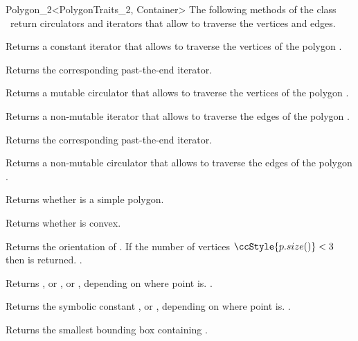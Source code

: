 \begin{ccRefClass}{Polygon_2<PolygonTraits_2, Container>}
\ccAccessFunctions
The following methods of the class \ccClassName\ return
circulators and iterators that allow to traverse the vertices and edges.

    { Returns a constant iterator that allows to traverse the vertices of
      the polygon .}

    { Returns the corresponding past-the-end iterator. }

    { Returns a mutable circulator that allows to traverse the vertices of
      the polygon .}

    { Returns a non-mutable iterator that allows to traverse the edges of
      the polygon .}

    { Returns the corresponding past-the-end iterator. }

    { Returns a non-mutable circulator that allows to traverse the edges of
      the polygon .}

\ccPredicates

    { Returns whether  is a simple polygon.}

    { Returns whether  is convex. }

    { Returns the orientation of \ccVar. If the number of vertices 
      $\ccStyle{p.size()} < 3$ then  is returned.
      \ccPrecond {}.
    }

    { Returns , or ,
       or , 
       depending on where point  is.
      \ccPrecond {}.
    }

    { Returns the symbolic constant , 
      or , depending on where point
       is.
      \ccPrecond {}.
    }

    { Returns the smallest bounding box containing \ccVar.}
    

\end{ccRefClass}
